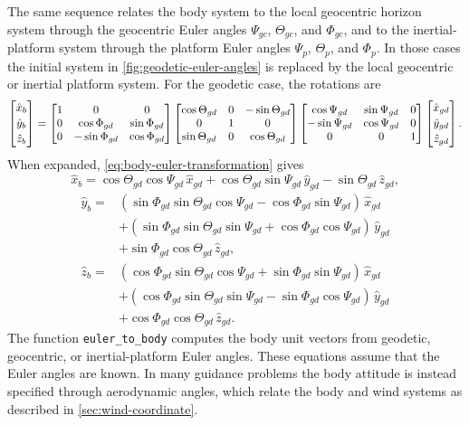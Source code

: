 The same sequence relates the body system to the local geocentric horizon system
through the geocentric Euler angles $\Psi_{gc}$, $\Theta_{gc}$, and
$\Phi_{gc}$, and to the inertial-platform system through the platform Euler angles
$\Psi_p$, $\Theta_p$, and $\Phi_p$. In those cases the initial system in
\cref{fig:geodetic-euler-angles} is replaced by the local geocentric or inertial
platform system. For the geodetic case, the rotations are
\begin{equation}
  \begin{bmatrix}
    \hat{x}_b\\[0.2em]
    \hat{y}_b\\[0.2em]
    \hat{z}_b
  \end{bmatrix}
  =
  \begin{bmatrix} 1 & 0 & 0 \\ 0 & \cos \Phi_{gd} & \sin \Phi_{gd} \\ 0 & -\sin \Phi_{gd} & \cos \Phi_{gd} \end{bmatrix}
  \begin{bmatrix} \cos \Theta_{gd} & 0 & -\sin \Theta_{gd} \\ 0 & 1 & 0 \\ \sin \Theta_{gd} & 0 & \cos \Theta_{gd} \end{bmatrix}
  \begin{bmatrix} \cos \Psi_{gd} & \sin \Psi_{gd} & 0 \\ -\sin \Psi_{gd} & \cos \Psi_{gd} & 0 \\ 0 & 0 & 1 \end{bmatrix}
  \begin{bmatrix}
    \hat{x}_{gd}\\[0.2em]
    \hat{y}_{gd}\\[0.2em]
    \hat{z}_{gd}
  \end{bmatrix}.
  \label{eq:body-euler-transformation}
\end{equation}
When expanded, \cref{eq:body-euler-transformation} gives
\begin{equation}
  \hat{x}_b
  = \cos\Theta_{gd}\cos\Psi_{gd}\,\hat{x}_{gd}
  + \cos\Theta_{gd}\sin\Psi_{gd}\,\hat{y}_{gd}
  - \sin\Theta_{gd}\,\hat{z}_{gd},
  \label{eq:body-x-from-geodetic-euler}
\end{equation}
\begin{equation}
  \begin{aligned}
  \hat{y}_b
  ={}&
  (\sin\Phi_{gd}\sin\Theta_{gd}\cos\Psi_{gd}
   -\cos\Phi_{gd}\sin\Psi_{gd})\,\hat{x}_{gd}\\
  &+(\sin\Phi_{gd}\sin\Theta_{gd}\sin\Psi_{gd}
   +\cos\Phi_{gd}\cos\Psi_{gd})\,\hat{y}_{gd}\\
  &+\sin\Phi_{gd}\cos\Theta_{gd}\,\hat{z}_{gd},
  \end{aligned}
  \label{eq:body-y-from-geodetic-euler}
\end{equation}
\begin{equation}
  \begin{aligned}
  \hat{z}_b
  ={}&
  (\cos\Phi_{gd}\sin\Theta_{gd}\cos\Psi_{gd}
   +\sin\Phi_{gd}\sin\Psi_{gd})\,\hat{x}_{gd}\\
  &+(\cos\Phi_{gd}\sin\Theta_{gd}\sin\Psi_{gd}
   -\sin\Phi_{gd}\cos\Psi_{gd})\,\hat{y}_{gd}\\
  &+\cos\Phi_{gd}\cos\Theta_{gd}\,\hat{z}_{gd}.
  \end{aligned}
  \label{eq:body-z-from-geodetic-euler}
\end{equation}
The function \texttt{euler\_to\_body} computes the body unit vectors from
geodetic, geocentric, or inertial-platform Euler angles. These equations assume
that the Euler angles are known. In many guidance problems the body attitude is
instead specified through aerodynamic angles, which relate the body and wind
systems as described in \cref{sec:wind-coordinate}.


